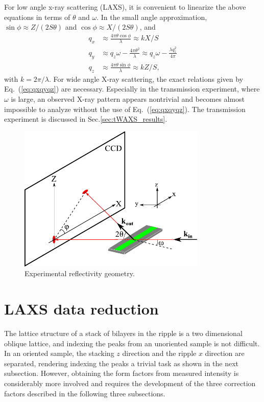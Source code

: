 For low angle x-ray scattering (LAXS), it is convenient to linearize the above
equations in terms of $\theta$ and $\omega$. In the small angle approximation, 
$\sin\phi \approx Z/(2S\theta)$ and $\cos\phi \approx X/(2S\theta)$, and
\begin{align}
  q_x &\approx \frac{4\pi\theta\cos\phi}{\lambda} \approx kX/S \nonumber\\
  q_y &\approx q_z\omega -\frac{4\pi\theta^2}{\lambda} \approx q_z\omega - \frac{\lambda q_z^2}{4\pi}\nonumber\\
  q_z &\approx \frac{4\pi\theta\sin\phi}{\lambda} \approx kZ/S,
  \label{eq:qxqyqz_small}
\end{align}
with $k=2\pi/\lambda$. For wide angle X-ray scattering, the exact relations given
by Eq.~(\ref{eq:qxqyqz}) are necessary. Especially in the transmission experiment,
where $\omega$ is large, an observed X-ray pattern appears nontrivial and becomes
almost impossible to analyze without the use of Eq.~(\ref{eq:qxqyqz}).
The transmission experiment is discussed in Sec.\ref{sec:tWAXS_results}.

\begin{figure}[htbp]
  \centering
  \includegraphics[width=0.8\textwidth]{figures/ripple/analysis/laxs_setup}
  \caption{Experimental reflectivity geometry.}
  \label{fig:laxs_setup}
\end{figure}

\newpage
\section{LAXS data reduction}\label{sec:LAXS_data_reduction}
The lattice structure of a stack of bilayers in the ripple is a two dimensional
oblique lattice, and indexing the peaks from an unoriented sample is not 
difficult. In an oriented sample, the stacking $z$ direction and the ripple
$x$ direction are separated, rendering indexing the peaks a trivial task as 
shown in the next subsection.
However, obtaining the form factors from measured intensity is considerably
more involved and requires the development of the three correction factors 
described in the following three subsections.

